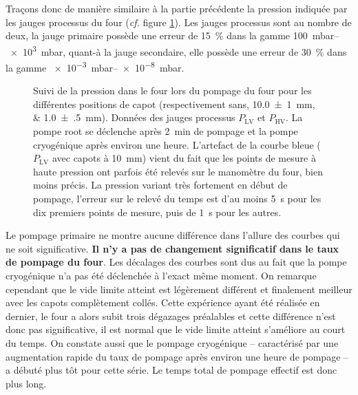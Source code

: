 Traçons donc de manière similaire à la partie précédente la pression indiquée par les jauges processus du four (\textit{cf.} figure \ref{fig:pompage_pFour}). Les jauges processus sont au nombre de deux, la jauge primaire possède une erreur de \SI{15}{\percent} dans la gamme \SIrange{100}{e3}{\milli\bar}\cite{manuelJaugeLv}, quant-à la jauge secondaire, elle possède une erreur de \SI{30}{\percent} dans la gamme \SIrange{e-3}{e-8}{\milli\bar}\cite{manuelJaugeHv}.

\begin{figure}
    \centering
    \scalebox{1}{}
    \caption{Suivi de la pression dans le four lors du pompage du four pour les différentes positions de capot (respectivement sans, \SIlist{10.0(10);1.0(5)}{mm}). Données des jauges processus $P_\text{LV}$ et $P_\text{HV}$. La pompe root se déclenche après \SI{2}{\minute} de pompage et la pompe cryogénique après environ une heure. L'artefact de la courbe bleue ($P_\text{LV}$ avec capots à \SI{10}{\milli\meter}) vient du fait que les points de mesure à haute pression ont parfois été relevés sur le manomètre du four, bien moins précis. La pression variant très fortement en début de pompage, l'erreur sur le relevé du temps est d'au moins \SI{5}{\second} pour les dix premiers points de mesure, puis de \SI{1}{\second} pour les autres.}
    \label{fig:pompage_pFour}
\end{figure}

Le pompage primaire ne montre aucune différence dans l'allure des courbes qui ne soit significative. \textbf{Il n'y a pas de changement significatif dans le taux de pompage du four}. Les décalages des courbes sont dus au fait que la pompe cryogénique n'a pas été déclenchée à l'exact même moment. On remarque cependant que le vide limite atteint est légèrement différent et finalement meilleur avec les capots complètement collés. Cette expérience ayant été réalisée en dernier, le four a alors subit trois dégazages préalables et cette différence n'est donc pas significative, il est normal que le vide limite atteint s'améliore au court du temps. On constate aussi que le pompage cryogénique -- caractérisé par une augmentation rapide du taux de pompage après environ une heure de pompage -- a débuté plus tôt pour cette série. Le temps total de pompage effectif est donc plus long.

